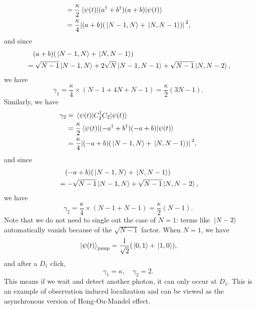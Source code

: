 \documentclass[hyperref, a4paper]{article}
\begin{document}
\begin{itemize}
\[\begin{aligned}
        &= \frac{\kappa}{2}  \expval{(a^\dagger + b^\dagger) (a + b)}{\psi(t)}  \\
        &= \frac{\kappa}{4} \abs*{(a + b) (\ket*{N-1, N} + \ket*{N, N-1})}^2,
    \end{aligned}
\]
and since 
\[
    \begin{aligned}
        &\quad (a + b) (\ket*{N-1, N} + \ket*{N, N-1}) \\
        &= \sqrt{N-1} \ket*{N-1, N} + 2 \sqrt{N} \ket*{N-1, N-1} + \sqrt{N-1} \ket*{N, N-2},
    \end{aligned}
\]
we have 
\begin{equation}
    \gamma_1 = \frac{\kappa}{4} \times (N-1 + 4 N + N-1) = \frac{\kappa}{2} (3N-1).
\end{equation}
Similarly, we have 
\[
    \begin{aligned}
        \gamma_2 &= \expval{C_2^\dagger C_2}{\psi(t)} \\
        &= \frac{\kappa}{2}  \expval{(- a^\dagger + b^\dagger) (- a + b)}{\psi(t)}  \\
        &= \frac{\kappa}{4} \abs*{(- a + b) (\ket*{N-1, N} + \ket*{N, N-1})}^2,
    \end{aligned}
\]
and since 
\[
    \begin{aligned}
        &\quad (- a + b) (\ket*{N-1, N} + \ket*{N, N-1}) \\
        &= - \sqrt{N-1} \ket*{N-1, N} + \sqrt{N-1} \ket*{N, N-2},
    \end{aligned}
\]
we have 
\begin{equation}
    \gamma_2 = \frac{\kappa}{4} \times (N-1 + N - 1) = \frac{\kappa}{2} (N-1).
\end{equation}
Note that we do not need to single out the case of $N=1$: terms like $\ket*{N-2}$ automatically vanish because 
of the $\sqrt{N-1}$ factor. When $N=1$, we have 
\begin{equation}
    \ket*{\psi(t)}_\text{jump} = \frac{1}{\sqrt{2}} (\ket*{0, 1} + \ket*{1, 0}),
\end{equation}
and after a $D_1$ click, 
\begin{equation}
    \gamma_1 = \kappa, \quad \gamma_2 = 2.
\end{equation}
This means if we wait and detect another photon, it can only occur at $D_1$. This is an example of observation
induced localization and can be viewed as the asynchronous version of Hong-Ou-Mandel effect.
\end{itemize}

\paragraph{}
\end{document}
